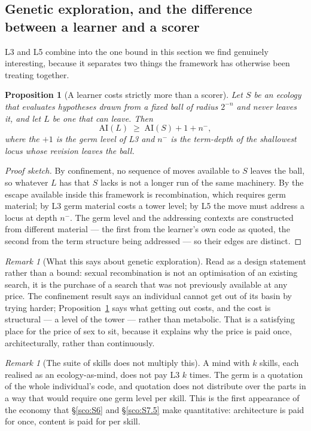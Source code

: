 \documentclass[11pt]{article}
\theoremstyle{plain}
\newtheorem{proposition}[theorem]{Proposition}
\theoremstyle{definition}
\theoremstyle{remark}
\newtheorem{remark}[theorem]{Remark}
\newcommand{\AI}{\mathrm{AI}}
\begin{document}
\subsection{Genetic exploration, and the difference between a learner and a scorer}
\label{sco:S5.3}

L3 and L5 combine into the one bound in this section we find genuinely
interesting, because it separates two things the framework has otherwise
been treating together.

\begin{proposition}[A learner costs strictly more than a scorer]
\label{sco:prop:learner}
Let $S$ be an ecology that evaluates hypotheses drawn from a fixed ball of
radius $2^{-n}$ and never leaves it, and let $L$ be one that can leave. Then
\[
  \AI(L) \;\ge\; \AI(S) + 1 + n^{-},
\]
where the $+1$ is the germ level of L3 and $n^{-}$ is the term-depth of the
shallowest locus whose revision leaves the ball.
\end{proposition}

\begin{proof}[Proof sketch]
By confinement, no sequence of moves available to $S$ leaves the ball, so
whatever $L$ has that $S$ lacks is not a longer run of the same machinery.
By \cite[\S6.5]{scientist} the escape available inside this framework is
recombination, which requires germ material; by L3 germ material costs a
tower level; by L5 the move must address a locus at depth $n^{-}$. The
germ level and the addressing contexts are constructed from different
material --- the first from the learner's own code as quoted, the second
from the term structure being addressed --- so their edges are distinct.
\end{proof}

\begin{remark}[What this says about genetic exploration]\label{sco:rem:genetic}
Read as a design statement rather than a bound: sexual recombination is
not an optimisation of an existing search, it is the purchase of a search
that was not previously available at any price. The confinement result
says an individual cannot get out of its basin by trying harder;
Proposition~\ref{sco:prop:learner} says what getting out costs, and the
cost is structural --- a level of the tower --- rather than metabolic.
That is a satisfying place for the price of sex to sit, because it
explains why the price is paid once, architecturally, rather than
continuously.
\end{remark}

\begin{remark}[The suite of skills does not multiply this]\label{sco:rem:oneg}
A mind with $k$ skills, each realised as an ecology-as-mind, does not pay
L3 $k$ times. The germ is a quotation of the whole individual's code, and
quotation does not distribute over the parts in a way that would require
one germ level per skill. This is the first appearance of the economy that
\S\ref{sco:S6} and \S\ref{sco:S7.5} make quantitative: architecture is
paid for once, content is paid for per skill.
\end{remark}
\end{document}
